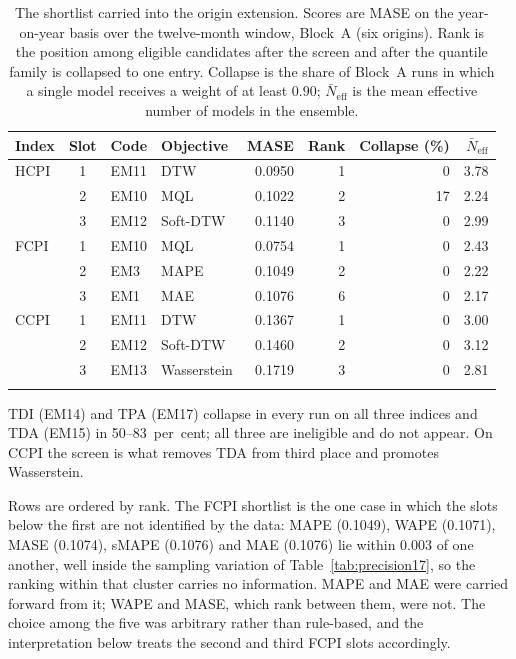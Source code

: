 \documentclass[12pt]{article}
\begin{document}
\begin{table}[htbp]
\centering
\caption{The shortlist carried into the origin extension. Scores are MASE on the
year-on-year basis over the twelve-month window, Block~A (six origins). Rank is the
position among eligible candidates after the screen and after the quantile family is
collapsed to one entry. Collapse is the share of Block~A runs in which a single model
receives a weight of at least $0.90$; $\bar{N}_{\mathrm{eff}}$ is the mean effective
number of models in the ensemble.}
\label{tab:shortlist}
\begin{threeparttable}\small
\begin{tabular}{@{}l c l l r r r r@{}}
\toprule
Index & Slot & Code & Objective & MASE & Rank & Collapse (\%) & $\bar{N}_{\mathrm{eff}}$ \\
\midrule
HCPI & 1 & EM11 & DTW & 0.0950 & 1 & 0 & 3.78 \\
 & 2 & EM10 & MQL & 0.1022 & 2 & 17 & 2.24 \\
 & 3 & EM12 & Soft-DTW & 0.1140 & 3 & 0 & 2.99 \\
\addlinespace[2pt]
FCPI & 1 & EM10 & MQL & 0.0754 & 1 & 0 & 2.43 \\
 & 2 & EM3 & MAPE & 0.1049 & 2 & 0 & 2.22 \\
 & 3 & EM1 & MAE & 0.1076 & 6 & 0 & 2.17 \\
\addlinespace[2pt]
CCPI & 1 & EM11 & DTW & 0.1367 & 1 & 0 & 3.00 \\
 & 2 & EM12 & Soft-DTW & 0.1460 & 2 & 0 & 3.12 \\
 & 3 & EM13 & Wasserstein & 0.1719 & 3 & 0 & 2.81 \\
\addlinespace[2pt]
\bottomrule
\end{tabular}
\begin{tablenotes}[flushleft]\footnotesize
\item TDI (EM14) and TPA (EM17) collapse in every run on all three indices and TDA (EM15) in 50--83~per~cent; all three are ineligible and do not appear. On CCPI the screen is what removes TDA from third place and promotes Wasserstein.
\item Rows are ordered by rank. The FCPI shortlist is the one case in which the slots below the first are not identified by the data: MAPE (0.1049), WAPE (0.1071), MASE (0.1074), sMAPE (0.1076) and MAE (0.1076) lie within 0.003 of one another, well inside the sampling variation of Table~\ref{tab:precision17}, so the ranking within that cluster carries no information. MAPE and MAE were carried forward from it; WAPE and MASE, which rank between them, were not. The choice among the five was arbitrary rather than rule-based, and the interpretation below treats the second and third FCPI slots accordingly.
\end{tablenotes}
\end{threeparttable}
\end{table}
\end{document}
